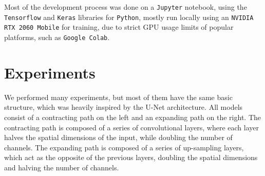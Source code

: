 \documentclass[11pt]{article}
\begin{document}
\begin{multicols}{2}

      Most of the development process was done on a \texttt{Jupyter} notebook, using the \texttt{Tensorflow}\cite{TensorFlow} and \texttt{Keras}\cite{chollet2015keras} libraries for \texttt{Python}, mostly run locally using an \texttt{NVIDIA RTX 2060 Mobile} for training, due to strict GPU usage limits of popular platforms, such as \texttt{Google Colab}.

      \label{sec:experiments}
      \section{Experiments}
      We performed many experiments, but most of them have the same basic structure, which was heavily inspired by the U-Net\cite{ronneberger2015unetconvolutionalnetworksbiomedical} architecture. All models consist of a contracting path on the left and an expanding path on the right. The contracting path is composed of a series of convolutional layers, where each layer halves the spatial dimensions of the input, while doubling the number of channels. The expanding path is composed of a series of up-sampling layers, which act as the opposite of the previous layers, doubling the spatial dimensions and halving the number of channels.


\end{multicols}
\end{document}
